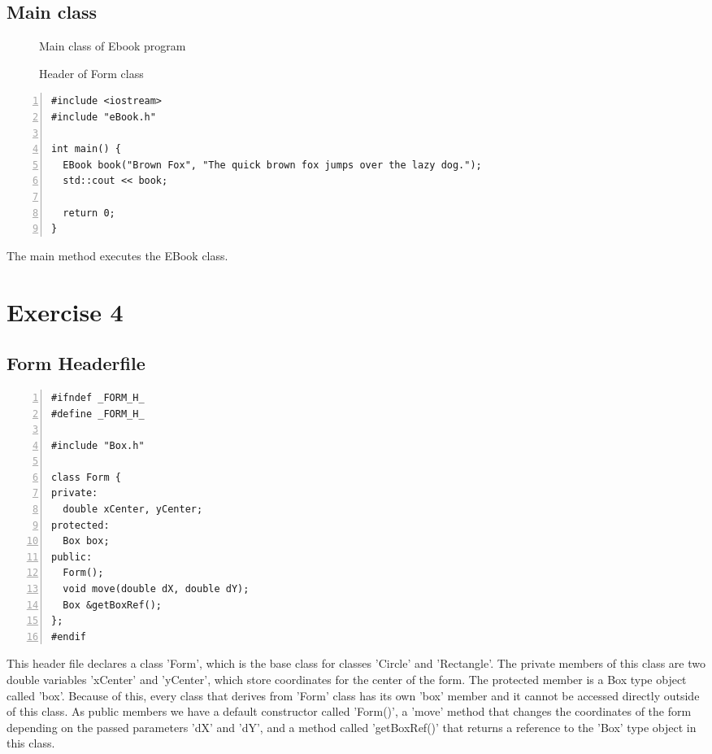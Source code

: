 \documentclass{article}
\begin{document}
\subsection{Main class}
\begin{figure}
  \scriptsize{\caption{Main class of Ebook program}}
  \scriptsize{\caption{Header of Form class}}
\end{figure}
\begin{lstlisting}[basicstyle=\footnotesize\ttfamily, numbers=left, stepnumber=1, numberstyle = \normalsize, caption={My Caption}]
#include <iostream>
#include "eBook.h"

int main() {
  EBook book("Brown Fox", "The quick brown fox jumps over the lazy dog.");
  std::cout << book;

  return 0;
}
\end{lstlisting}
\normalsize{The main method executes the EBook class.}
\section{Exercise 4}

\subsection{Form Headerfile}
\begin{lstlisting}[basicstyle=\footnotesize\ttfamily, numbers=left, stepnumber=1, numberstyle = \normalsize, caption={My Caption}]
#ifndef _FORM_H_
#define _FORM_H_

#include "Box.h"

class Form {
private:
  double xCenter, yCenter;
protected:
  Box box;
public:
  Form();
  void move(double dX, double dY);
  Box &getBoxRef();
};
#endif
\end{lstlisting}
\normalsize{This header file declares a class 'Form', which is the base class for classes 'Circle' and 'Rectangle'. The private members of this class are two double variables 'xCenter' and 'yCenter', which store coordinates for the center of the form.
The protected member is a Box type object called 'box'. Because of this, every class that derives from 'Form' class has its own 'box' member and it cannot be accessed directly outside of this class.
As public members we have a default constructor called 'Form()', a 'move' method that changes the coordinates of the form depending on the passed parameters 'dX' and 'dY', and a method called 'getBoxRef()' that returns a reference to the 'Box' type object in this class.

}\newpage%
\end{document}
